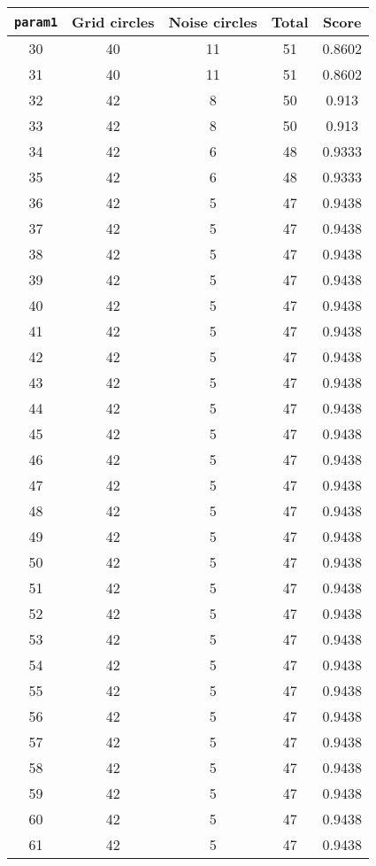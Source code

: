 \documentclass[letterpaper, 12pt]{article}
\begin{document}
\begin{longtable}{|c|c|c|c|c|}
\hline
\textbf{\texttt{param1}} & \textbf{Grid circles} & \textbf{Noise circles} & \textbf{Total} & \textbf{Score} \\
\hline
30 & 40 & 11 & 51 & 0.8602 \\
\hline
31 & 40 & 11 & 51 & 0.8602 \\
\hline
32 & 42 & 8 & 50 & 0.913 \\
\hline
33 & 42 & 8 & 50 & 0.913 \\
\hline
34 & 42 & 6 & 48 & 0.9333 \\
\hline
35 & 42 & 6 & 48 & 0.9333 \\
\hline
36 & 42 & 5 & 47 & 0.9438 \\
\hline
37 & 42 & 5 & 47 & 0.9438 \\
\hline
38 & 42 & 5 & 47 & 0.9438 \\
\hline
39 & 42 & 5 & 47 & 0.9438 \\
\hline
40 & 42 & 5 & 47 & 0.9438 \\
\hline
41 & 42 & 5 & 47 & 0.9438 \\
\hline
42 & 42 & 5 & 47 & 0.9438 \\
\hline
43 & 42 & 5 & 47 & 0.9438 \\
\hline
44 & 42 & 5 & 47 & 0.9438 \\
\hline
45 & 42 & 5 & 47 & 0.9438 \\
\hline
46 & 42 & 5 & 47 & 0.9438 \\
\hline
47 & 42 & 5 & 47 & 0.9438 \\
\hline
48 & 42 & 5 & 47 & 0.9438 \\
\hline
49 & 42 & 5 & 47 & 0.9438 \\
\hline
50 & 42 & 5 & 47 & 0.9438 \\
\hline
51 & 42 & 5 & 47 & 0.9438 \\
\hline
52 & 42 & 5 & 47 & 0.9438 \\
\hline
53 & 42 & 5 & 47 & 0.9438 \\
\hline
54 & 42 & 5 & 47 & 0.9438 \\
\hline
55 & 42 & 5 & 47 & 0.9438 \\
\hline
56 & 42 & 5 & 47 & 0.9438 \\
\hline
57 & 42 & 5 & 47 & 0.9438 \\
\hline
58 & 42 & 5 & 47 & 0.9438 \\
\hline
59 & 42 & 5 & 47 & 0.9438 \\
\hline
60 & 42 & 5 & 47 & 0.9438 \\
\hline
61 & 42 & 5 & 47 & 0.9438 \\

\end{longtable}
\end{document}
